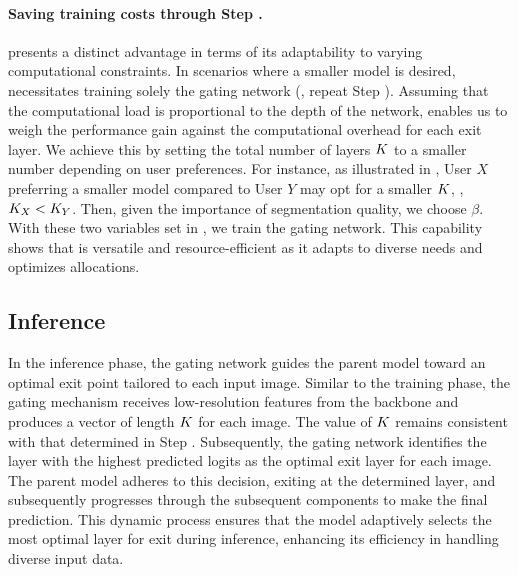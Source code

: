 \paragraph{Saving training costs through Step \stepC.}
 {\ours} presents a distinct advantage in terms of its adaptability to varying computational constraints. In scenarios where a smaller model is desired, {\ours} necessitates training solely the gating network (\ie, repeat Step \stepC). Assuming that the computational load is proportional to the depth of the network,  enables us to weigh the performance gain against the computational overhead for each exit layer. We achieve this by setting the total number of layers $K$ to a smaller number depending on user preferences. For instance, as illustrated in , User $X$ preferring a smaller model compared to User $Y$ may opt for a smaller $K$, \ie, $K_X<K_Y$. Then, given the importance of segmentation quality, we choose $\beta$. With these two variables set in , we train the gating network. This capability shows that {\ours} is versatile and resource-efficient as it adapts to diverse needs and optimizes allocations.
%
\subsection{Inference}
In the inference phase, the gating network guides the parent model toward an optimal exit point tailored to each input image. Similar to the training phase, the gating mechanism receives low-resolution features from the backbone and produces a vector of length $K$ for each image. The value of $K$ remains consistent with that determined in Step \stepC. Subsequently, the gating network identifies the layer with the highest predicted logits as the optimal exit layer for each image. The parent model adheres to this decision, exiting at the determined layer, and subsequently progresses through the subsequent components to make the final prediction. This dynamic process ensures that the model adaptively selects the most optimal layer for exit during inference, enhancing its efficiency in handling diverse input data.